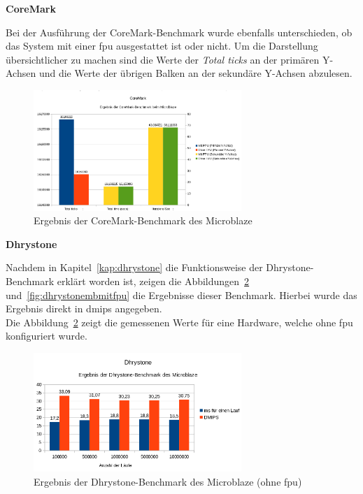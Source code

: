 \textbf{CoreMark}

Bei der Ausführung der CoreMark-Benchmark wurde ebenfalls unterschieden, ob das System mit einer \ac{fpu} ausgestattet ist oder nicht.
Um die Darstellung übersichtlicher zu machen sind die Werte der \emph{Total ticks} an der primären Y-Achsen und die Werte der übrigen Balken an der sekundäre Y-Achsen abzulesen.\\

\begin{figure}[H]
\centering
\includegraphics[width=0.7\textwidth]{Hauptteil/coremarkmb.png}
\caption{Ergebnis der CoreMark-Benchmark des Microblaze}
\label{fig:coremarkmb}
\end{figure}

\textbf{Dhrystone}

Nachdem in Kapitel~\ref{kap:dhrystone} die Funktionsweise der Dhrystone-Benchmark erklärt worden ist, zeigen die Abbildungen~\ref{fig:dhrystonembohnefpu} und~\ref{fig:dhrystonembmitfpu} die Ergebnisse dieser Benchmark.
Hierbei wurde das Ergebnis direkt in \ac{dmips} angegeben.\\
Die Abbildung~\ref{fig:dhrystonembohnefpu} zeigt die gemessenen Werte für eine Hardware, welche ohne \ac{fpu} konfiguriert wurde.

\begin{figure}[H]
\centering
\includegraphics[width=0.7\textwidth]{Hauptteil/dhrystonembohnefpu.png}
\caption{Ergebnis der Dhrystone-Benchmark des Microblaze (ohne \ac{fpu})}
\label{fig:dhrystonembohnefpu}
\end{figure}

